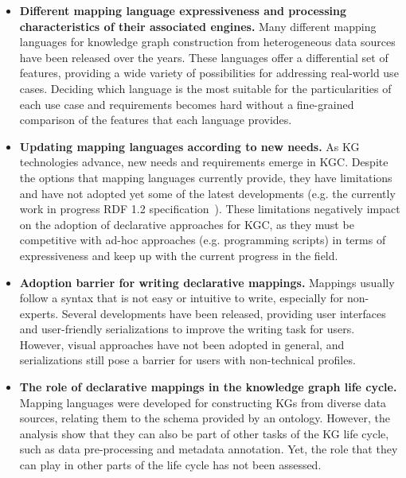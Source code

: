 \begin{itemize}
    \item \textbf{Different mapping language expressiveness and processing characteristics of their associated engines.} Many different mapping languages for knowledge graph construction from heterogeneous data sources have been released over the years. These languages offer a differential set of features, providing a wide variety of possibilities for addressing real-world use cases. Deciding which language is the most suitable for the particularities of each use case and requirements becomes hard without a fine-grained comparison of the features that each language provides. 
    
    \item \textbf{Updating mapping languages according to new needs.} As KG technologies advance, new needs and requirements emerge in KGC. Despite the options that mapping languages currently provide, they have limitations and have not adopted yet some of the latest developments (e.g. the currently work in progress RDF 1.2 specification~\parencite{hartig2023rdf}). These limitations negatively impact on the adoption of declarative approaches for KGC, as they must be competitive with ad-hoc approaches (e.g. programming scripts) in terms of expressiveness and keep up with the current progress in the field.
    
    \item \textbf{Adoption barrier for writing declarative mappings.} Mappings usually follow a syntax that is not easy or intuitive to write, especially for non-experts. Several developments have been released, providing user interfaces and user-friendly serializations to improve the writing task for users. However, visual approaches have not been adopted in general, and serializations still pose a barrier for users with non-technical profiles. 

    
    \item \textbf{The role of declarative mappings in the knowledge graph life cycle.} Mapping languages were developed for constructing KGs from diverse data sources, relating them to the schema provided by an ontology. However, the analysis show that they can also be part of other tasks of the KG life cycle, such as data pre-processing and metadata annotation. Yet, the role that they can play in other parts of the life cycle has not been assessed. 
\end{itemize}
